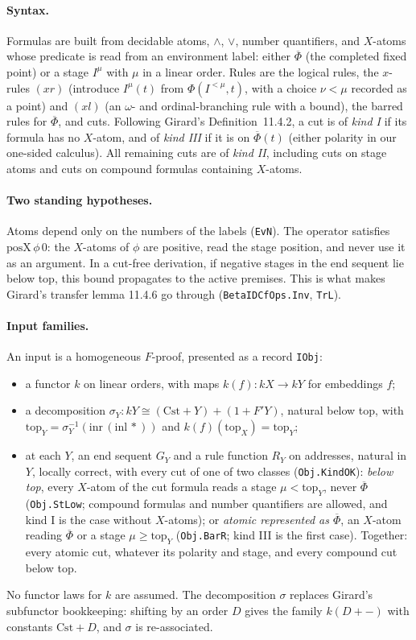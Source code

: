 \documentclass[11pt]{article}
\theoremstyle{remark}
\newcommand{\Phib}{\overline{\Phi}}
\newcommand{\Cst}{\mathrm{Cst}}
\renewcommand{\tt}[1]{\texttt{#1}}
\begin{document}
\paragraph{Syntax.} Formulas are built from decidable atoms, $\wedge$,
$\vee$, number quantifiers, and $X$-atoms whose predicate is read from an
environment label: either $\Phib$ (the completed fixed point) or a stage
$I^\mu$ with $\mu$ in a linear order. Rules are the logical rules, the
$x$-rules $(xr)$ (introduce $I^\mu(t)$ from $\Phi(I^{<\mu},t)$, with a
choice $\nu<\mu$ recorded as a point) and $(xl)$ (an $\omega$- and
ordinal-branching rule with a bound), the barred rules for $\Phib$, and
cuts. Following Girard's Definition~11.4.2, a cut is of \emph{kind I}
if its formula has no $X$-atom, and of \emph{kind III} if it is on
$\Phib(t)$ (either polarity in our one-sided calculus). All remaining
cuts are of \emph{kind II}, including cuts on stage atoms and cuts on
compound formulas containing $X$-atoms.

\paragraph{Two standing hypotheses.} Atoms depend only on the numbers of
the labels (\tt{EvN}). The operator satisfies $\mathrm{posX}\,\phi\,0$: the
$X$-atoms of $\phi$ are positive, read the stage position, and never use
it as an argument. In a cut-free derivation, if negative stages in the
end sequent lie below top, this bound propagates to the active premises.
This is what makes Girard's transfer
lemma 11.4.6 go through (\tt{BetaIDCfOps.Inv}, \tt{TrL}).

\paragraph{Input families.} An input is a homogeneous $F$-proof, presented
as a record \tt{IObj}:
\begin{itemize}
\item a functor $k$ on linear orders, with maps $k(f):kX\to kY$ for
embeddings $f$;
\item a decomposition $\sigma_Y : kY\cong(\Cst+Y)+(1+F'Y)$, natural below
top, with $\mathrm{top}_Y=\sigma_Y^{-1}(\mathrm{inr}\,(\mathrm{inl}\,\ast))$ and
$k(f)(\mathrm{top}_X)=\mathrm{top}_Y$;
\item at each $Y$, an end sequent $G_Y$ and a rule function $R_Y$ on
addresses, natural in $Y$, locally correct, with every cut of one of two classes
(\texttt{Obj.KindOK}): \emph{below top}, every $X$-atom of the cut formula
reads a stage $\mu<\mathrm{top}_Y$, never $\Phib$ (\texttt{Obj.StLow};
compound formulas and number quantifiers are allowed, and kind I is the
case without $X$-atoms); or \emph{atomic represented as $\Phib$}, an
$X$-atom reading $\Phib$ or a stage $\mu\ge\mathrm{top}_Y$
(\texttt{Obj.BarR}; kind III is the first case). Together: every atomic
cut, whatever its polarity and stage, and every compound cut below top.
\end{itemize}
No functor laws for $k$ are assumed. The decomposition $\sigma$ replaces
Girard's subfunctor bookkeeping: shifting by an order $D$ gives the family
$k(D+-)$ with constants $\Cst+D$, and $\sigma$ is re-associated.
\end{document}
